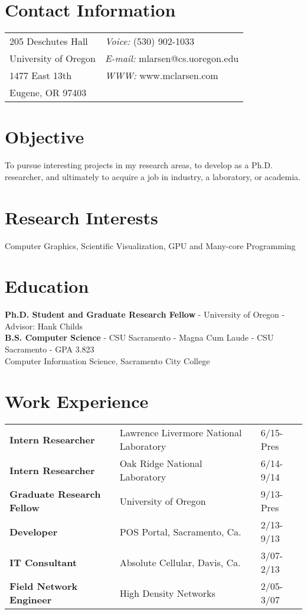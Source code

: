 \documentclass[margin,line]{res}
\begin{document}

\begin{resume}
\section{\sc Contact Information}
\vspace{.05in}
\begin{tabular}{@{}p{2in}p{4in}}
205 Deschutes Hall     & {\it Voice:}  (530) 902-1033 \\            
University of Oregon   &  {\it E-mail:}  mlarsen@cs.uoregon.edu\\         
1477 East 13th         &  {\it WWW:} www.mclarsen.com\\       
Eugene, OR 97403       &  \\     
\end{tabular}

\section{\sc Objective}
To pursue interesting projects in my research areas, to develop as a Ph.D. researcher, and ultimately to acquire a job in industry, a laboratory, or academia.
\section{\sc Research Interests}
Computer Graphics, Scientific Visualization, GPU and Many-core Programming

\section{\sc Education}
\textbf{Ph.D. Student and Graduate Research Fellow} - University of Oregon - Advisor: Hank Childs
\\
\textbf{B.S. Computer Science} - CSU Sacramento - Magna Cum Laude - CSU Sacramento - GPA 3.823 %
\\
Computer Information Science, Sacramento City College

\section{\sc Work Experience}

\begin{tabular}{lll}
\textbf{Intern Researcher}	& Lawrence Livermore National Laboratory & 6/15-Pres \\
\textbf{Intern Researcher}	& Oak Ridge National Laboratory & 6/14-9/14 \\
\textbf{Graduate Research Fellow}	& University of Oregon  & 9/13-Pres \\
\textbf{Developer}	& POS Portal, Sacramento, Ca.  & 2/13-9/13 \\
\textbf{IT Consultant}	& Absolute Cellular, Davis, Ca. & 3/07- 2/13 \\
\textbf{Field Network Engineer}	& High Density Networks & 2/05- 3/07
\end{tabular}


\end{resume}
\end{document}
